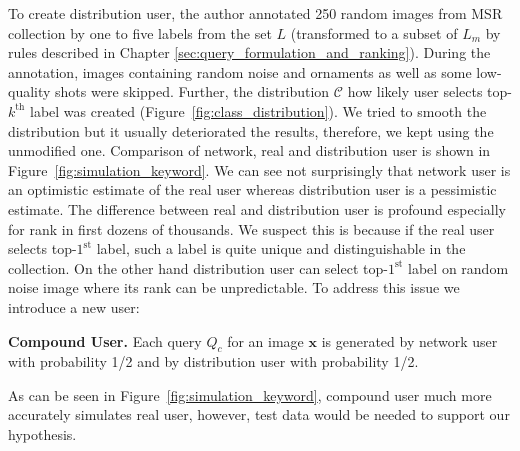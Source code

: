 To create distribution user, the author annotated 250 random images from MSR collection by one to five labels from the set $L$ (transformed to a subset of $L_m$ by rules described in Chapter \ref{sec:query_formulation_and_ranking}). During the annotation, images containing random noise and ornaments as well as some low-quality shots were skipped. Further, the distribution $\mathcal{C}$ how likely user selects top-$k^{\mathrm{th}}$ label was created (Figure~\ref{fig:class_distribution}). We tried to smooth the distribution but it usually deteriorated the results, therefore, we kept using the unmodified one. Comparison of network, real and distribution user is shown in Figure~\ref{fig:simulation_keyword}. We can see not surprisingly that network user is an optimistic estimate of the real user whereas distribution user is a pessimistic estimate. The difference between real and distribution user is profound especially for rank in first dozens of thousands. We suspect this is because if the real user selects top-$1^{\mathrm{st}}$ label, such a label is quite unique and distinguishable in the collection. On the other hand distribution user can select top-$1^{\mathrm{st}}$ label on random noise image where its rank can be unpredictable. To address this issue we introduce a new user:
\begin{description}[labelwidth=1em, leftmargin=!]
	\item \textbf{Compound User.} Each query $Q_c$ for an image $\bm{x}$ is generated by network user with probability 1/2 and by distribution user with probability 1/2.
\end{description}
As can be seen in Figure~\ref{fig:simulation_keyword}, compound user much more accurately simulates real user, however, test data would be needed to support our hypothesis. 

